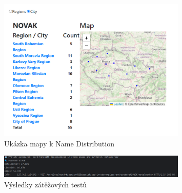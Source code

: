 \documentclass[czech, ba, kiv, he]{fasthesis}
\begin{document}
\begin{figure}[h]  
    \centering  
    \includegraphics[width=0.8\textwidth]{name_distribution_map.png}  
    \caption{Ukázka mapy k Name Distribution}  
\end{figure}

\begin{figure}[h]  
    \centering  
    \includegraphics[width=0.8\textwidth]{performance_tests.png}  
    \caption{Výsledky zátěžových testů}  
\end{figure}

\backmatter
\printbibliography
\listoffigures
\listoftables
\listoflistings



\backpage
\end{document}
